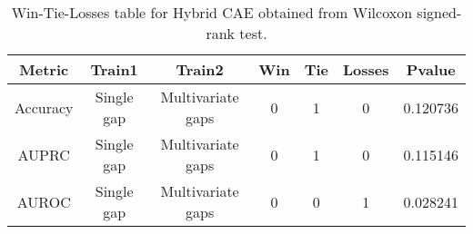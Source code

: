 \begin{table}[H]
\centering
\begin{tabular}{|c|c|c|c|c|c|c|}

\textbf{Metric} & \textbf{Train1} &    \textbf{Train2} &  \textbf{Win} &  \textbf{Tie} &  \textbf{Losses} &  \textbf{Pvalue} \\
\hline

       Accuracy &      Single gap &  Multivariate gaps &             0 &             1 &                0 &         0.120736 \\
\hline
          AUPRC &      Single gap &  Multivariate gaps &             0 &             1 &                0 &         0.115146 \\
\hline
          AUROC &      Single gap &  Multivariate gaps &             0 &             0 &                1 &         0.028241 \\
\hline

\end{tabular}
\caption{Win-Tie-Losses table for Hybrid CAE obtained from Wilcoxon signed-rank test.}
\label{tab:hybrid_cae_training_data_comparison}
\end{table}